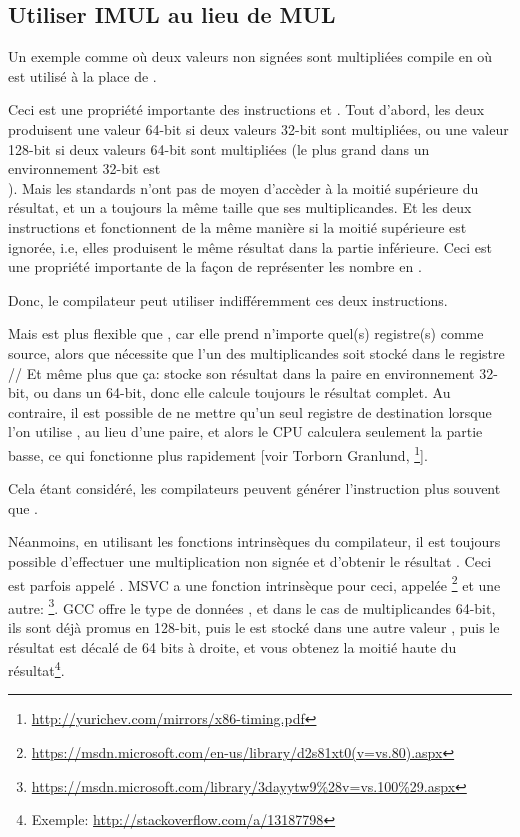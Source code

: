 \subsection{Utiliser IMUL au lieu de MUL}
\label{IMUL_over_MUL}

Un exemple comme  où deux valeurs non signées sont multipliées
compile en  où \IMUL est utilisé à la place de \MUL.

Ceci est une propriété importante des instructions \MUL et \IMUL.
Tout d'abord, les deux produisent une valeur 64-bit si deux valeurs 32-bit sont multipliées,
ou une valeur 128-bit si deux valeurs 64-bit sont multipliées (le plus grand 
dans un environnement 32-bit est \\
).
Mais les standards \CCpp n'ont pas de moyen d'accèder à la moitié supérieure du résultat,
et un  a toujours la même taille que ses multiplicandes.
Et les deux instructions \MUL et \IMUL fonctionnent de la même manière si la moitié
supérieure est ignorée, i.e, elles produisent le même résultat dans la partie inférieure.
Ceci est une propriété importante de la façon de représenter les nombre en .

Donc, le compilateur \CCpp peut utiliser indifféremment ces deux instructions.

Mais \IMUL est plus flexible que \MUL, car elle prend n'importe quel(s) registre(s) comme
source, alors que \MUL nécessite que l'un des multiplicandes soit stocké dans le
registre \AX/\EAX/\RAX
Et même plus que ça: \MUL stocke son résultat dans la paire  en environnement
32-bit, ou  dans un 64-bit, donc elle calcule toujours le résultat complet.
Au contraire, il est possible de ne mettre qu'un seul registre de destination lorsque
l'on utilise \IMUL, au lieu d'une paire, et alors le \ac{CPU} calculera seulement
la partie basse, ce qui fonctionne plus rapidement [voir Torborn Granlund,
\footnote{\url{http://yurichev.com/mirrors/x86-timing.pdf}}].

Cela étant considéré, les compilateurs \CCpp peuvent générer l'instruction \IMUL
plus souvent que \MUL.

Néanmoins, en utilisant les fonctions intrinsèques du compilateur, il est toujours
possible d'effectuer une multiplication non signée et d'obtenir le résultat .
Ceci est parfois appelé .
MSVC a une fonction intrinsèque pour ceci, appelée \footnote{\url{https://msdn.microsoft.com/en-us/library/d2s81xt0(v=vs.80).aspx}}
et une autre: \footnote{\url{https://msdn.microsoft.com/library/3dayytw9%28v=vs.100%29.aspx}}.
GCC offre le type de données , et dans le cas de multiplicandes 64-bit,
ils sont déjà promus en 128-bit, puis le  est stocké dans
une autre valeur , puis le résultat est décalé de 64 bits à droite,
et vous obtenez la moitié haute du résultat\footnote{Exemple: \url{http://stackoverflow.com/a/13187798}}.

